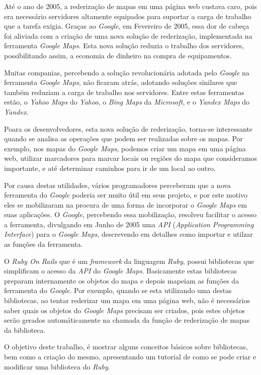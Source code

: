 Até o ano de 2005, a rederização de mapas em uma página web custava caro, pois era necessário
servidores altamente equipados para suportar a carga de trabalho que a tarefa exigia.
Graças ao \emph{Google}, em Fevereiro de 2005, essa dor de cabeça foi aliviada com a criação
de uma nova solução de rederização, implementada na ferramenta \emph{Google Maps}. Esta nova
solução reduzia o trabalho dos servidores, possibilitando assim, a economia de dinheiro na
compra de equipamentos.

Muitas companias, percebendo a solução revolucionária adotada pelo \emph{Google} na
ferramenta \emph{Google Maps}, não ficaram atrás, adotando soluções sinilares que
também reduziam a carga de trabalho nos servidores. Entre estas ferramentas estão, o
\emph{Yahoo Maps} do \emph{Yahoo}, o \emph{Bing Maps} da \emph{Microsoft}, e o
\emph{Yandex Maps} do \emph{Yandex}.

Poara os desenvolvedores, esta nova solução de rederização, torna-se interessante
quando se analisa as operações que podem ser realizadas sobre os mapas. Por exemplo, nos mapas
do \emph{Google Maps}, podemos criar um mapa em uma página web, utilizar marcadores para
marcar locais ou regiões do mapa que consideramos importante, e até determinar caminhos
para ir de um local ao outro.

Por causa destas utilidades, vários programadores perceberam que a nova ferramenta do
\emph{Google} poderia ser muito útil em seus projeto, e por este motivo eles se mobilizaram
na procura de uma forma de incorporar o \emph{Google Maps} em suas aplicações. O
\emph{Google}, percebendo essa mobilização, resolveu facilitar o acesso a ferramenta, divulgando
em Junho de 2005 uma \emph{API} (\emph{Application Programming Interface}) para o
\emph{Google Maps}, descrevendo em detalhes como importar e utilzar as funções da ferramenta.

O \emph{Ruby On Rails} que é um \emph{framework} da linguagem \emph{Ruby}, possui
bibliotecas que simplificam o acesso da \emph{API} do \emph{Google Maps}. Basicamente estas
bibliotecas preparam internamente os objetos do mapa e depois mapeiam as funções da
ferramenta do \emph{Google}. Por exemplo, quando se esta utilizando uma destas bibliotecas,
ao tentar rederizar um mapa em uma página web, não é necessários saber quais os objetos do
\emph{Google Maps} precisam ser criados, pois estes objetos serão gerados automáticamente
na chamada da função de rederização de mapas da biblioteca.

O objetivo deste trabalho, é mostrar alguns conceitos básicos sobre bibliotecas, bem
como a criação do mesmo, apresentando um tutorial de como se pode criar e modificar
uma biblioteca do \emph{Ruby}.

